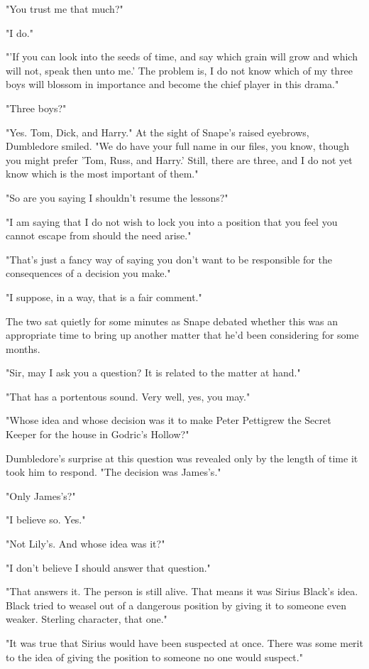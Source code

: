 \documentclass[a4paper,11pt]{article}
\begin{document}
"You trust me that much?"

"I do."

"'If you can look into the seeds of time, and say which grain will grow and which will not, speak then unto me.' The problem is, I do not know which of my three boys will blossom in importance and become the chief player in this drama."

"Three boys?"

"Yes. Tom, Dick, and Harry." At the sight of Snape's raised eyebrows, Dumbledore smiled. "We do have your full name in our files, you know, though you might prefer 'Tom, Russ, and Harry.' Still, there are three, and I do not yet know which is the most important of them."

"So are you saying I shouldn't resume the lessons?"

"I am saying that I do not wish to lock you into a position that you feel you cannot escape from should the need arise."

"That's just a fancy way of saying you don't want to be responsible for the consequences of a decision you make."

"I suppose, in a way, that is a fair comment."

The two sat quietly for some minutes as Snape debated whether this was an appropriate time to bring up another matter that he'd been considering for some months.

"Sir, may I ask you a question? It is related to the matter at hand."

"That has a portentous sound. Very well, yes, you may."

"Whose idea and whose decision was it to make Peter Pettigrew the Secret Keeper for the house in Godric's Hollow?"

Dumbledore's surprise at this question was revealed only by the length of time it took him to respond. "The decision was James's."

"Only James's?"

"I believe so. Yes."

"Not Lily's. And whose idea was it?"

"I don't believe I should answer that question."

"That answers it. The person is still alive. That means it was Sirius Black's idea. Black tried to weasel out of a dangerous position by giving it to someone even weaker. Sterling character, that one."

"It was true that Sirius would have been suspected at once. There was some merit to the idea of giving the position to someone no one would suspect."
\end{document}
